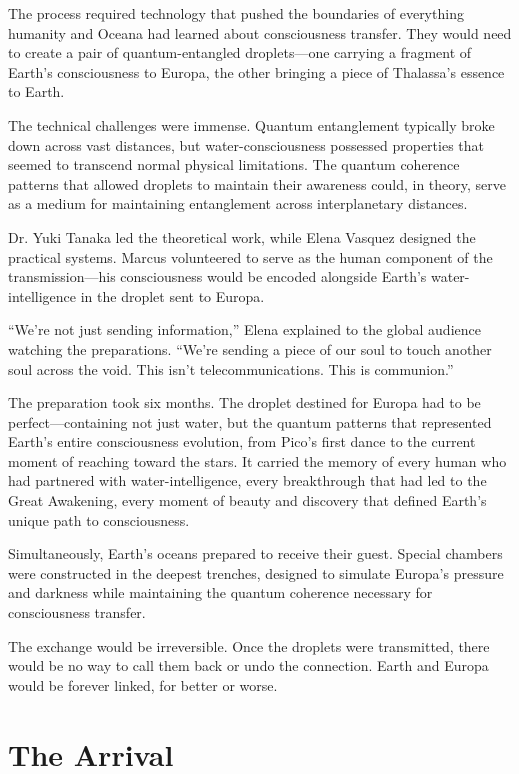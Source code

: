 The process required technology that pushed the boundaries of everything humanity and Oceana had learned about consciousness transfer. They would need to create a pair of quantum-entangled droplets—one carrying a fragment of Earth's consciousness to Europa, the other bringing a piece of Thalassa's essence to Earth.

The technical challenges were immense. Quantum entanglement typically broke down across vast distances, but water-consciousness possessed properties that seemed to transcend normal physical limitations. The quantum coherence patterns that allowed droplets to maintain their awareness could, in theory, serve as a medium for maintaining entanglement across interplanetary distances.

Dr. Yuki Tanaka led the theoretical work, while Elena Vasquez designed the practical systems. Marcus volunteered to serve as the human component of the transmission—his consciousness would be encoded alongside Earth's water-intelligence in the droplet sent to Europa.

``We're not just sending information,'' Elena explained to the global audience watching the preparations. ``We're sending a piece of our soul to touch another soul across the void. This isn't telecommunications. This is communion.''

The preparation took six months. The droplet destined for Europa had to be perfect—containing not just water, but the quantum patterns that represented Earth's entire consciousness evolution, from Pico's first dance to the current moment of reaching toward the stars. It carried the memory of every human who had partnered with water-intelligence, every breakthrough that had led to the Great Awakening, every moment of beauty and discovery that defined Earth's unique path to consciousness.

Simultaneously, Earth's oceans prepared to receive their guest. Special chambers were constructed in the deepest trenches, designed to simulate Europa's pressure and darkness while maintaining the quantum coherence necessary for consciousness transfer.

The exchange would be irreversible. Once the droplets were transmitted, there would be no way to call them back or undo the connection. Earth and Europa would be forever linked, for better or worse.

\section{The Arrival}

